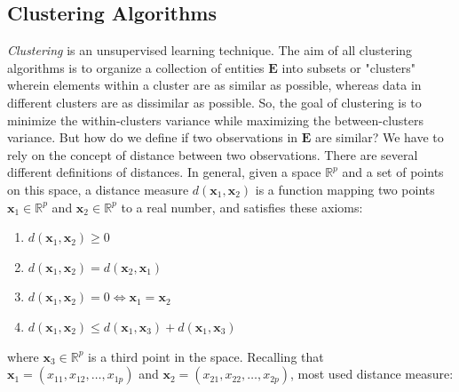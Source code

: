 
\subsection{Clustering Algorithms}
\label{sec:clustering}
\emph{Clustering} is an unsupervised learning technique. The aim of all clustering algorithms is to organize a collection of entities $\mathbf{E}$ into subsets or "clusters" wherein elements within a cluster are as similar as possible, whereas data in different clusters are as dissimilar as possible. So, the goal of clustering is to minimize the within-clusters variance while maximizing the between-clusters variance. But how do we define if two observations in $\mathbf{E}$ are similar? We have to rely on the concept of distance between two observations. There are several different definitions of distances. In general, given a space $\mathbb{R}^p$ and a set of points on this space, a distance measure $d\left(\mathbf{x}_1,\mathbf{x}_2\right)$ is a function mapping two points $\mathbf{x}_1\in\mathbb{R}^p$ and $\mathbf{x}_2\in\mathbb{R}^p$ to a real number, and satisfies these axioms:
\begin{enumerate}
    \item $d\left(\mathbf{x}_1,\mathbf{x}_2\right) \geq 0$
    \item $d\left(\mathbf{x}_1,\mathbf{x}_2\right) = d\left(\mathbf{x}_2,\mathbf{x}_1\right)$
    \item $d\left(\mathbf{x}_1,\mathbf{x}_2\right)=0 \Leftrightarrow \mathbf{x}_1 = \mathbf{x}_2$
    \item $d\left(\mathbf{x}_1,\mathbf{x}_2\right) \leq d\left(\mathbf{x}_1,\mathbf{x}_3\right) + d\left(\mathbf{x}_1,\mathbf{x}_3\right)$
\end{enumerate}
where $\mathbf{x}_3 \in \mathbb{R}^p$ is a third point in the space. Recalling that $\mathbf{x}_1=\left(x_{11}, x_{12}, \dots, x_{1p} \right)$ and $\mathbf{x}_2=\left(x_{21}, x_{22}, \dots, x_{2p} \right)$, most used distance measure:
